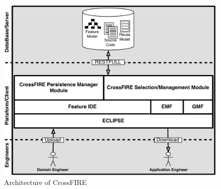 \begin{figure}[!h]
\centering
 \includegraphics[scale=0.7]{Figuras/NovaArquitetura2}
\caption{Architecture of CrossFIRE}
\label{fig:architecture}
\end{figure}